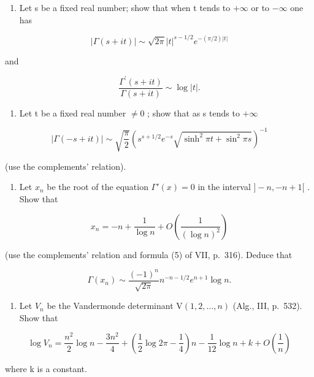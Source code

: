 \begin{enumerate}
\def\labelenumi{\arabic{enumi})}
\setcounter{enumi}{2}
\tightlist
\item
  Let s be a fixed real number; show that when t tends to \(+\infty\) or to \(-\infty\) one has
\end{enumerate}

\[
| \Gamma (s + i t) | \sim \sqrt {2 \pi} | t | ^ {s - 1 / 2} e ^ {- (\pi / 2) | t |}
\]

and

\[
\frac {\Gamma^ {\prime} (s + i t)}{\Gamma (s + i t)} \sim \log | t |.
\]

\begin{enumerate}
\def\labelenumi{\arabic{enumi})}
\setcounter{enumi}{3}
\tightlist
\item
  Let t be a fixed real number \(\neq 0\) ; show that as s tends to \(+\infty\)
\end{enumerate}

\[
| \Gamma (- s + i t) | \sim \sqrt {\frac {\pi}{2}} \left(s ^ {s + 1 / 2} e ^ {- s} \sqrt {\sinh^ {2} \pi t + \sin^ {2} \pi s}\right) ^ {- 1}
\]

(use the complements' relation).

\begin{enumerate}
\def\labelenumi{\arabic{enumi})}
\setcounter{enumi}{4}
\tightlist
\item
  Let \(x_{n}\) be the root of the equation \(\Gamma'(x) = 0\) in the interval \(] - n, -n + 1[\) . Show that
\end{enumerate}

\[
x _ {n} = - n + \frac {1}{\log n} + O \left(\frac {1}{(\log n) ^ {2}}\right)
\]

(use the complements' relation and formula (5) of VII, p.~316). Deduce that

\[
\Gamma (x _ {n}) \sim \frac {(- 1) ^ {n}}{\sqrt {2 \pi}} n ^ {- n - 1 / 2} e ^ {n + 1} \log n.
\]

\begin{enumerate}
\def\labelenumi{\arabic{enumi})}
\setcounter{enumi}{5}
\tightlist
\item
  Let \(V_{n}\) be the Vandermonde determinant \(\mathrm{V}(1,2,\dots,n)\) (Alg., III, p.~532). Show that
\end{enumerate}

\[
\log V _ {n} = \frac {n ^ {2}}{2} \log n - \frac {3 n ^ {2}}{4} + \left(\frac {1}{2} \log 2 \pi - \frac {1}{4}\right) n - \frac {1}{12} \log n + k + O \left(\frac {1}{n}\right)
\]

where k is a constant.

